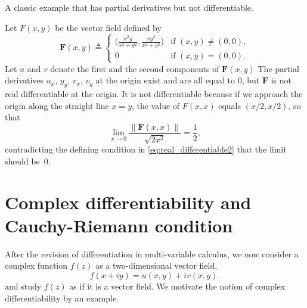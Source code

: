 A classic example  that has partial derivatives but not differentiable.
\begin{example} \label{ex:non_differential_vector_function}
Let $F(x,y)$ be the vector field defined by
$$
\mathbf{F}(x,y) \triangleq 
\begin{cases}
\big( \frac{x^2y}{x^2+y^2}, \frac{xy^2}{x^2+y^2} \big)	& \text{if } (x,y)\neq (0,0) , \\
0 & \text{if } (x,y)=(0,0).
\end{cases}
$$
Let $u$ and $v$ denote the first and the second components of $\mathbf{F}(x,y)$
The partial derivatives $u_x$, $y_y$, $v_x$, $v_y$ at the origin exist and are all equal to 0, but $\mathbf{F}$ is not real differentiable at the origin. It is not differentiable because if we approach the origin along the straight line $x=y$, the value of $F(x,x)$ equals $(x/2,x/2)$, so that
$$
\lim_{x\rightarrow 0}\frac{\| \mathbf{F}(x,x)\| }{\sqrt{2x^2}} = \frac{1}{2},
$$
contradicting the defining condition in \eqref{eq:real_differentiable2} that the limit should be~0.
\end{example}


\section{Complex differentiability and Cauchy-Riemann condition}

After the revision of differentiation in multi-variable calculus, we now consider a complex function $f(z)$ as a two-dimensional vector field,
$$
f(x+iy) = u(x,y) + i v(x,y).
$$
and study $f(z)$ as if it is a vector field. We motivate the notion of complex differentiability by an example.

